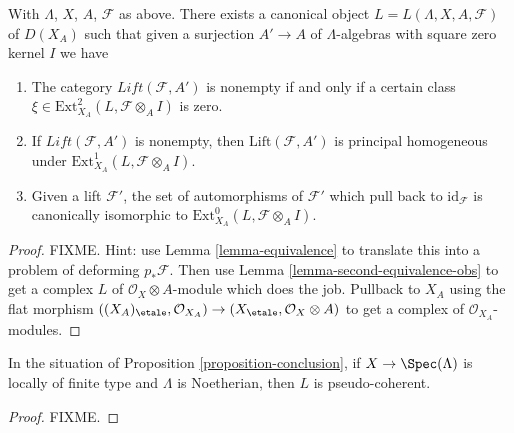 \begin{proposition}
\label{proposition-conclusion}
With $\Lambda$, $X$, $A$, $\mathcal{F}$ as above. There exists a canonical
object $L = L(\Lambda, X, A, \mathcal{F})$ of $D(X_A)$ such that given a
surjection $A' \to A$ of $\Lambda$-algebras with square zero kernel $I$ we
have
\begin{enumerate}
\item The category $\textit{Lift}(\mathcal{F}, A')$ is nonempty
if and only if a certain class $\xi \in \text{Ext}^2_{X_A}(L,
\mathcal{F} \otimes_A I)$ is zero.
\item If $\textit{Lift}(\mathcal{F}, A')$ is nonempty, then
$\text{Lift}(\mathcal{F}, A')$ is principal homogeneous under
$\text{Ext}^1_{X_A}(L, \mathcal{F} \otimes_A I)$.
\item Given a lift $\mathcal{F}'$, the set of automorphisms of
$\mathcal{F}'$ which pull back to $\text{id}_\mathcal{F}$ is canonically
isomorphic to
$\text{Ext}^0_{X_A}(L, \mathcal{F} \otimes_A I)$.
\end{enumerate}
\end{proposition}

\begin{proof}
FIXME. Hint: use Lemma \ref{lemma-equivalence} to translate this
into a problem of deforming $p_*\mathcal{F}$. Then use
Lemma \ref{lemma-second-equivalence-obs} to get a complex $L$
of $\mathcal{O}_X \otimes A$-module which does the job. Pullback
to $X_A$ using the flat morphism
$((X_A)_\etale, \mathcal{O}_{X_A}) \to
(X_\etale, \mathcal{O}_X \otimes A)$
to get a complex of $\mathcal{O}_{X_A}$-modules.
\end{proof}

\begin{lemma}
\label{lemma-pseudo-coherent}
In the situation of Proposition \ref{proposition-conclusion}, if
$X \to \Spec(\Lambda)$ is locally of finite type and $\Lambda$ is Noetherian,
then $L$ is pseudo-coherent.
\end{lemma}

\begin{proof}
FIXME.
\end{proof}

















